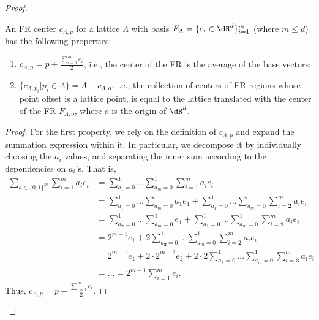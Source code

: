\begin{proof}
\begin{lemma}\label{Lattice-properties}
    An FR center \(c_{\Lambda,p}\) for a  lattice \(\Lambda\) with basis ${E_\Lambda=\{e_i\in \dR^d\}_{i=1}^m}$ (where $m\leq d$) has the following properties: 
    \begin{enumerate}
        \item \(c_{\Lambda,p}=p+\frac{\sum_{i=1}^m e_i}{2}\), i.e., the center of the FR is the average of the base vectors; 
        \item \(\{c_{\Lambda,p_i}|p_i\in\Lambda\}=\Lambda+c_{\Lambda,o}\), i.e., the collection of centers of FR regions whose point offset is a lattice point, is equal to the lattice translated with the center of the FR $F_{\Lambda,o}$, where $o$ is the origin of $\dR^d$.
    \end{enumerate}
\end{lemma}
\begin{proof}
    For the first property, we rely on the definition of $c_{\Lambda,p}$ and expand the summation expression within it. In particular, we decompose it by individually choosing the $a_i$ values, and separating the inner sum according to the dependencies on $a_i$'s. That is,
     \begin{align*}
  \sum_{a\in \{0,1\}^m}\sum_{i=1}^ma_ie_i &= \sum_{a_1=0}^1\ldots \sum_{a_m=0}^1\sum_{i=1}^ma_ie_i \\ &=
\sum_{a_1=0}^1\ldots \sum_{a_m=0}^1a_1e_1+\sum_{a_1=0}^1\ldots \sum_{a_m=0}^1\sum_{i=\bm{2}}^ma_ie_i \\ &=
\sum_{a_{\bm{2}}=0}^1\ldots \sum_{a_m=0}^1e_1+\sum_{a_1=0}^1\ldots \sum_{a_m=0}^1\sum_{i=\bm{2}}^ma_ie_i                             \\
                                      &=
2^{m-1}e_1+2\sum_{a_{\bm{2}}=0}^1\ldots \sum_{a_m=0}^1\sum_{i=\bm{2}}^ma_ie_i                             \\
                                        &=
2^{m-1}e_1+2\cdot 2^{m-2}e_2+ 2\cdot 2\sum_{a_{\bm{3}}=0}^1\ldots \sum_{a_m=0}^1\sum_{i=\bm{3}}^ma_ie_i                             \\  & = \ldots = 2^{m-1}\sum_{i=1}^m e_i. 
    \end{align*}
    Thus, $c_{\Lambda,p}=p+\frac{\sum_{i=1}^m e_i}{2}$.


\end{proof}
\end{proof}
